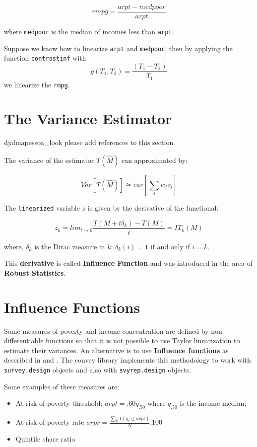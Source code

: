 \documentclass[]{book}
\begin{document}
\[
rmpg= \frac{arpt-medpoor} {arpt}
\]

where \texttt{medpoor} is the median of incomes less than \texttt{arpt}.

Suppose we know how to linearize \texttt{arpt} and \texttt{medpoor},
then by applying the function \texttt{contrastinf} with \[
g(T_1,T_2)= \frac{(T_1 - T_2)}{T_1}
\] we linearize the \texttt{rmpg}.

\section{The Variance Estimator}\label{the-variance-estimator}

djalmapessoa\_look please add references to this section

The variance of the estimator \(T(\hat{M})\) can approximated by:

\[Var\left[T(\hat{M})\right]\cong var\left[\sum_s w_i z_i\right]\]

The \texttt{linearized} variable \(z\) is given by the derivative of the
functional:

\[
z_k=lim_{t\rightarrow0}\frac{T(M+t\delta_k)-T(M)}{t}=IT_k(M)
\]

where, \(\delta_k\) is the Dirac measure in \(k\): \(\delta_k(i)=1\) if
and only if \(i=k\).

This \textbf{derivative} is called \textbf{Influence Function} and was
introduced in the area of \textbf{Robust Statistics}.

\section{Influence Functions}\label{influence-functions}

Some measures of poverty and income concentration are defined by
non-differentiable functions so that it is not possible to use Taylor
linearization to estimate their variances. An alternative is to use
\textbf{Influence functions} as described in \citep{deville1999} and
\citep{osier2009}. The convey library implements this methodology to
work with \texttt{survey.design} objects and also with
\texttt{svyrep.design} objects.

Some examples of these measures are:

\begin{itemize}
\item
  At-risk-of-poverty threshold: \(arpt=.60q_{.50}\) where \(q_{.50}\) is
  the income median;
\item
  At-risk-of-poverty rate \(arpr=\frac{\sum_U 1(y_i \leq arpt)}{N}.100\)
\item
  Quintile share ratio
\end{itemize}
\end{document}
